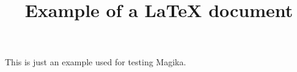 \documentclass{article}
\title{Example of a LaTeX document}
\begin{document}
  \maketitle

  This is just an example used for testing Magika.
\end{document}
